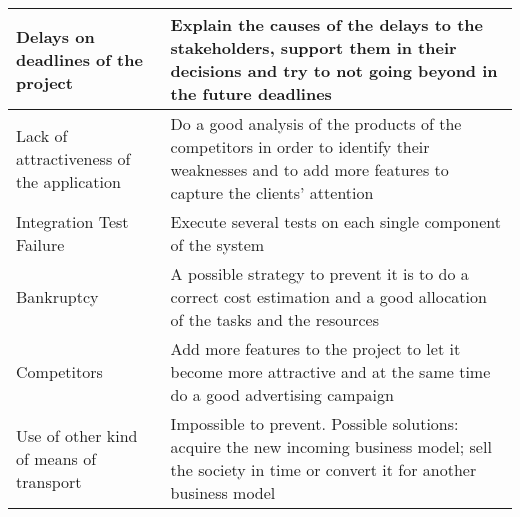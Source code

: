 \begin{longtable}{ll}
\begin{minipage}[t]{0.5\textwidth}
Delays on deadlines of the project
\end{minipage} &
\begin{minipage}[t]{0.45\textwidth}
Explain the causes of the delays to the stakeholders, support them in their decisions and try to not going beyond in the  future deadlines
\end{minipage} \\ \hline
\begin{minipage}[t]{0.5\textwidth}
Lack of attractiveness of the application
\end{minipage} &
\begin{minipage}[t]{0.45\textwidth}
Do a good analysis of the products of the competitors in order to identify their weaknesses and to add more features to capture the clients’ attention
\end{minipage} \\ \hline
\begin{minipage}[t]{0.5\textwidth}
Integration Test Failure
\end{minipage} &
\begin{minipage}[t]{0.45\textwidth}
Execute several tests on each single component of the system
\end{minipage} \\ \hline
\begin{minipage}[t]{0.5\textwidth}
Bankruptcy
\end{minipage} &
\begin{minipage}[t]{0.45\textwidth}
A possible strategy to prevent it is to do a correct cost estimation and a good allocation of the tasks and the resources
\end{minipage} \\ \hline
\begin{minipage}[t]{0.5\textwidth}
Competitors
\end{minipage} &
\begin{minipage}[t]{0.45\textwidth}
Add more features to the project to let it become more attractive and at the same time do a good advertising campaign
\end{minipage} \\ \hline
\begin{minipage}[t]{0.5\textwidth}
Use of other kind of means of transport
\end{minipage} &
\begin{minipage}[t]{0.45\textwidth}
Impossible to prevent. Possible solutions: acquire the new incoming business model; sell the society in time or convert it for another business model

\end{minipage}
\end{longtable}
